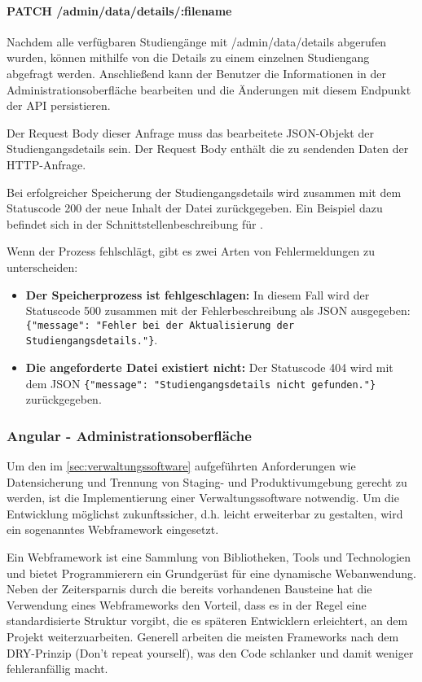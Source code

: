 \paragraph*{PATCH /admin/data/details/:filename}
\vspace{-1.0em}
Nachdem alle verfügbaren Studiengänge mit /admin/data/details abgerufen wurden, können mithilfe von  die Details zu einem einzelnen Studiengang abgefragt werden. Anschließend kann der Benutzer die Informationen in der Administrationsoberfläche bearbeiten und die Änderungen mit diesem Endpunkt der API persistieren.

Der Request Body dieser Anfrage muss das bearbeitete JSON-Objekt der Studiengangsdetails sein. Der Request Body enthält die zu sendenden Daten der HTTP-Anfrage. \parencite{parthiban_essential_2023}

Bei erfolgreicher Speicherung der Studiengangsdetails wird zusammen mit dem Statuscode 200 der neue Inhalt der Datei zurückgegeben. Ein Beispiel dazu befindet sich in der Schnittstellenbeschreibung für .

\noindent
Wenn der Prozess fehlschlägt, gibt es zwei Arten von Fehlermeldungen zu unterscheiden:
\begin{itemize}
    \item \textbf{Der Speicherprozess ist fehlgeschlagen:} In diesem Fall wird der Statuscode 500 zusammen mit der Fehlerbeschreibung als JSON ausgegeben: \lstinline[style=python]|{"message": "Fehler bei der Aktualisierung der Studiengangsdetails."}|.
    \item \textbf{Die angeforderte Datei  existiert nicht:} Der Statuscode 404 wird mit dem JSON \lstinline[style=python]|{"message": "Studiengangsdetails nicht gefunden."}| zurückgegeben. 
\end{itemize}

\subsubsection{Angular - Administrationsoberfläche}
Um den im \autoref{sec:verwaltungssoftware} aufgeführten Anforderungen wie Datensicherung und Trennung von Staging- und Produktivumgebung gerecht zu werden, ist die Implementierung einer Verwaltungssoftware notwendig. Um die Entwicklung möglichst zukunftssicher, d.h. leicht erweiterbar zu gestalten, wird ein sogenanntes Webframework eingesetzt.

Ein Webframework ist eine Sammlung von Bibliotheken, Tools und Technologien und bietet Programmierern ein Grundgerüst für eine dynamische Webanwendung. Neben der Zeitersparnis durch die bereits vorhandenen Bausteine hat die Verwendung eines Webframeworks den Vorteil, dass es in der Regel eine standardisierte Struktur vorgibt, die es späteren Entwicklern erleichtert, an dem Projekt weiterzuarbeiten. Generell arbeiten die meisten Frameworks nach dem DRY-Prinzip (Don't repeat yourself), was den Code schlanker und damit weniger fehleranfällig macht.
\parencite{domainfactory_beliebtesten_2023}

